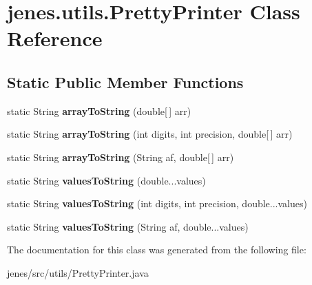 \hypertarget{classjenes_1_1utils_1_1_pretty_printer}{\section{jenes.\-utils.\-Pretty\-Printer Class Reference}
\label{classjenes_1_1utils_1_1_pretty_printer}
}
\subsection*{Static Public Member Functions}
\begin{DoxyCompactItemize}
\item 
\hypertarget{classjenes_1_1utils_1_1_pretty_printer_af1b7970ec18b6a847d1857cd9c804ff3}{static String {\bfseries array\-To\-String} (double\mbox{[}$\,$\mbox{]} arr)}\label{classjenes_1_1utils_1_1_pretty_printer_af1b7970ec18b6a847d1857cd9c804ff3}

\item 
\hypertarget{classjenes_1_1utils_1_1_pretty_printer_a4aea4a04a4f1c86a0b69c66b6831705d}{static String {\bfseries array\-To\-String} (int digits, int precision, double\mbox{[}$\,$\mbox{]} arr)}\label{classjenes_1_1utils_1_1_pretty_printer_a4aea4a04a4f1c86a0b69c66b6831705d}

\item 
\hypertarget{classjenes_1_1utils_1_1_pretty_printer_a2bf0b08b7aeaa282a3169be54103e0a0}{static String {\bfseries array\-To\-String} (String af, double\mbox{[}$\,$\mbox{]} arr)}\label{classjenes_1_1utils_1_1_pretty_printer_a2bf0b08b7aeaa282a3169be54103e0a0}

\item 
\hypertarget{classjenes_1_1utils_1_1_pretty_printer_a15b2c468ec5e89b449a51a532d3b2601}{static String {\bfseries values\-To\-String} (double...\-values)}\label{classjenes_1_1utils_1_1_pretty_printer_a15b2c468ec5e89b449a51a532d3b2601}

\item 
\hypertarget{classjenes_1_1utils_1_1_pretty_printer_af380a69bc4dac9e7dee1a178f26b4b12}{static String {\bfseries values\-To\-String} (int digits, int precision, double...\-values)}\label{classjenes_1_1utils_1_1_pretty_printer_af380a69bc4dac9e7dee1a178f26b4b12}

\item 
\hypertarget{classjenes_1_1utils_1_1_pretty_printer_a89c8fe653fb9bd04437bc2dcde97718e}{static String {\bfseries values\-To\-String} (String af, double...\-values)}\label{classjenes_1_1utils_1_1_pretty_printer_a89c8fe653fb9bd04437bc2dcde97718e}

\end{DoxyCompactItemize}


The documentation for this class was generated from the following file\-:\begin{DoxyCompactItemize}
\item 
jenes/src/utils/Pretty\-Printer.\-java\end{DoxyCompactItemize}
